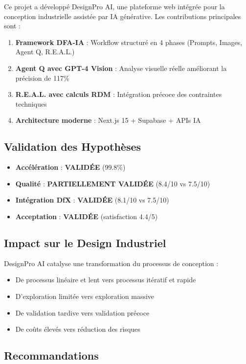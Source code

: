 \documentclass[12pt,a4paper]{article}
\begin{document}
Ce projet a développé DesignPro AI, une plateforme web intégrée pour la conception industrielle assistée par IA générative. Les contributions principales sont :

\begin{enumerate}
    \item \textbf{Framework DFA-IA} : Workflow structuré en 4 phases (Prompts, Images, Agent Q, R.E.A.L.)
    \item \textbf{Agent Q avec GPT-4 Vision} : Analyse visuelle réelle améliorant la précision de 117\%
    \item \textbf{R.E.A.L. avec calculs RDM} : Intégration précoce des contraintes techniques
    \item \textbf{Architecture moderne} : Next.js 15 + Supabase + APIs IA
\end{enumerate}

\subsection{Validation des Hypothèses}

\begin{itemize}
    \item \textbf{Accélération} : \textbf{VALIDÉE} (99.8\%)
    \item \textbf{Qualité} : \textbf{PARTIELLEMENT VALIDÉE} (8.4/10 vs 7.5/10)
    \item \textbf{Intégration DfX} : \textbf{VALIDÉE} (8.1/10 vs 7.5/10)
    \item \textbf{Acceptation} : \textbf{VALIDÉE} (satisfaction 4.4/5)
\end{itemize}

\subsection{Impact sur le Design Industriel}

DesignPro AI catalyse une transformation du processus de conception :
\begin{itemize}
    \item De processus linéaire et lent vers processus itératif et rapide
    \item D'exploration limitée vers exploration massive
    \item De validation tardive vers validation précoce
    \item De coûts élevés vers réduction des risques
\end{itemize}

\subsection{Recommandations}
\end{document}
